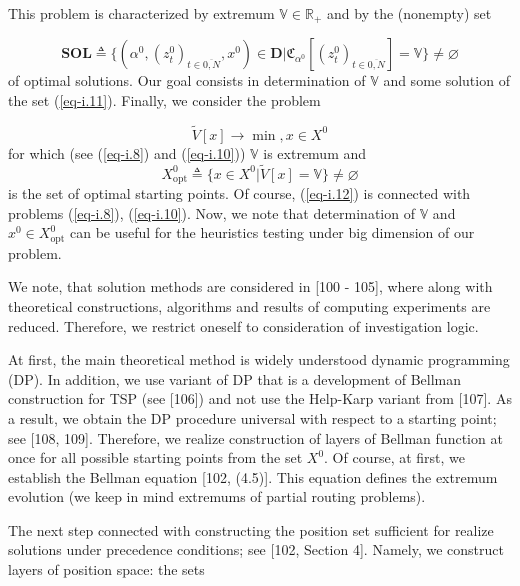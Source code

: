 \documentclass{article}
\begin{document}
This problem is characterized by extremum
$\mathbb V \in \mathbb R_+$
and by the (nonempty) set

\begin{equation}
  \label{eq-i.11}
  \mathbf{SOL}
  \triangleq
  \big\{
    (\alpha^0, (z_t^0)_{t \in \overline{0,N}}, x^0) \in \mathbf D
  \big|
    \mathfrak C_{\alpha^0}[(z_t^0)_{t \in \overline{0,N}}] = \mathbb V
  \big\}
  \neq \varnothing
\end{equation}
of optimal solutions.
Our goal consists in determination of
$\mathbb V$
and some solution of the set (\ref{eq-i.11}).
Finally, we consider the problem

\begin{equation}
  \label{eq-i.12}
  \tilde{V}[x] \to \min,
  x \in X^0
\end{equation}
for which
(see (\ref{eq-i.8}) and (\ref{eq-i.10}))
$\mathbb V$
is extremum and
\begin{equation*}
  X^0_{\mathrm{opt}}
  \triangleq
  \big\{
    x \in X^0
  \big|
    \tilde{V}[x] = \mathbb V
  \big\}
  \neq \varnothing
\end{equation*}
is the set of optimal starting points.
Of course,
(\ref{eq-i.12})
is connected with problems
(\ref{eq-i.8}), (\ref{eq-i.10}).
Now, we note that determination of
$\mathbb V$
and
$x^0 \in X^0_{\mathrm{opt}}$
can be useful for the heuristics testing
under big dimension of our problem.

We note, that solution methods are considered in
[100 - 105],       %
where along with theoretical constructions,
algorithms and results of computing experiments are reduced.
Therefore,
we restrict oneself to consideration of investigation logic.

At first,
the main theoretical method is widely understood dynamic programming
(DP).
In addition,
we use variant of DP that is a development of Bellman
construction for TSP
(see [106])   %
and not use the Help-Karp variant from
[107].        %
As a result,
we obtain the DP procedure universal with respect to
a starting point; see
[108, 109].   %
Therefore,
we realize construction of layers of Bellman function at once
for all possible starting points from the set
$X^0$.
Of course,
at first,
we establish the Bellman equation
[102, (4.5)].  %
This equation defines the extremum evolution
(we keep in mind extremums of partial routing problems).

The next step connected with constructing the position set
sufficient for realize solutions
under precedence conditions;
see
[102, Section 4].  %
Namely,
we construct layers of position space:
the sets
\end{document}
